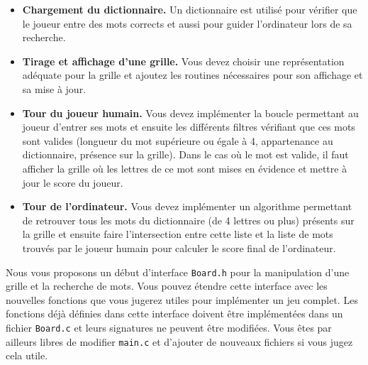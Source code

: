 \documentclass[a4paper,10pt]{article}
\begin{document}
\begin{itemize}
\item \textbf{Chargement du dictionnaire.} Un dictionnaire est utilisé pour
  vérifier que le joueur entre des mots corrects et aussi pour
  guider l'ordinateur lors de sa recherche.
\item \textbf{Tirage et affichage d'une grille.} Vous devez choisir une
  représentation adéquate pour la grille et ajoutez les routines nécessaires
  pour son affichage et sa mise à jour.
\item \textbf{Tour du joueur humain.} Vous devez implémenter la boucle
  permettant au joueur d'entrer ses mots et ensuite les
  différents filtres vérifiant que ces mots sont valides (longueur du
  mot supérieure ou égale à 4, appartenance au dictionnaire, présence
  sur la grille). Dans le cas où le mot est valide, il faut afficher
  la grille où les lettres de ce mot sont mises en évidence et mettre
  à jour le score du joueur.
\item \textbf{Tour de l'ordinateur.} Vous devez implémenter un algorithme
  permettant de retrouver tous les mots du dictionnaire (de 4 lettres
  ou plus) présents sur la grille et ensuite faire l'intersection
  entre cette liste et la liste de mots trouvés par le joueur humain
  pour calculer le score final de l'ordinateur.
\end{itemize}

Nous vous proposons un début d'interface \texttt{Board.h} pour la manipulation
d'une grille et la recherche de mots.  Vous pouvez étendre cette interface avec
les nouvelles fonctions que vous jugerez utiles pour implémenter un jeu complet.
Les fonctions déjà définies dans cette interface doivent être implémentées dans
un fichier \texttt{Board.c} et leurs signatures ne peuvent être modifiées. Vous
êtes par ailleurs libres de modifier \texttt{main.c} et d'ajouter de nouveaux
fichiers si vous jugez cela utile.
\end{document}
